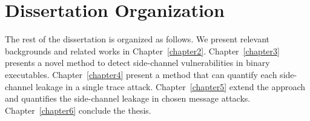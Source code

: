 \section{Dissertation Organization}
The rest of the dissertation is organized as follows. We present relevant backgrounds and related works in Chapter~\ref{chapter2}. Chapter~\ref{chapter3} presents a novel method to detect side-channel vulnerabilities in binary executables. Chapter~\ref{chapter4} present a method that can quantify each side-channel leakage in a single trace attack. Chapter~\ref{chapter5} extend the approach and quantifies the side-channel leakage in chosen message attacks. Chapter~\ref{chapter6} conclude the thesis.